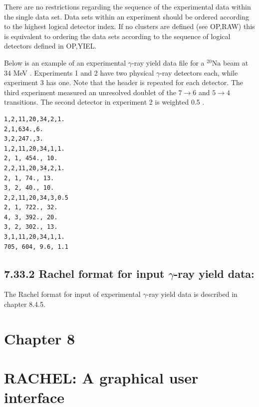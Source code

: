 \documentclass[10pt]{article}
\begin{document}
There are no restrictions regarding the sequence of the experimental data within the single data set. Data sets within an experiment should be ordered according to the highest logical detector index. If no clusters are defined (see OP,RAW) this is equivalent to ordering the data sets according to the sequence of logical detectors defined in OP,YIEL.

Below is an example of an experimental $\gamma$-ray yield data file for a ${ }^{20} \mathrm{Na}$ beam at 34 MeV . Experiments 1 and 2 have two physical $\gamma$-ray detectors each, while experiment 3 has one. Note that the header is repeated for each detector. The third experiment measured an unresolved doublet of the $7 \rightarrow 6$ and $5 \rightarrow 4$ transitions. The second detector in experiment 2 is weighted 0.5 .

\begin{verbatim}
1,2,11,20,34,2,1.
2,1,634.,6.
3,2,247.,3.
1,2,11,20,34,1,1.
2, 1, 454., 10.
2,2,11,20,34,2,1.
2, 1, 74., 13.
3, 2, 40., 10.
2,2,11,20,34,3,0.5
2, 1, 722., 32.
4, 3, 392., 20.
3, 2, 302., 13.
3,1,11,20,34,1,1.
705, 604, 9.6, 1.1
\end{verbatim}

\subsection*{7.33.2 Rachel format for input $\gamma$-ray yield data:}
The Rachel format for input of experimental $\gamma$-ray yield data is described in chapter 8.4.5.

\section*{Chapter 8}
\section*{RACHEL: A graphical user interface }
\end{document}
